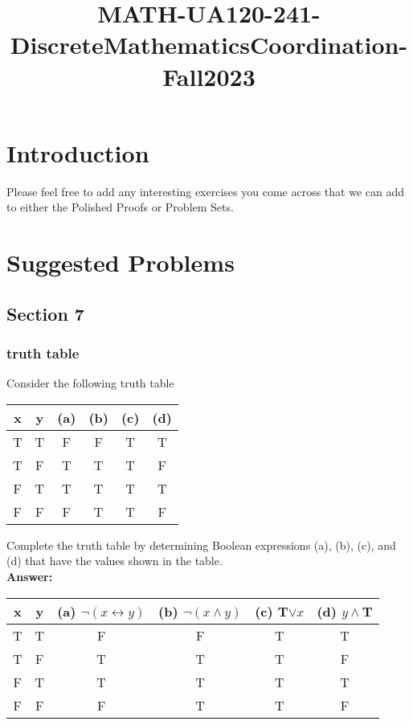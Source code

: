 \documentclass{article}
\title{MATH-UA120-241-DiscreteMathematicsCoordination-Fall2023}
\begin{document}
\maketitle

\section{Introduction}
Please feel free to add any interesting exercises you come across that we can add to either the Polished Proofs or Problem Sets.

\section{Suggested Problems}

\subsection{Section 7}

\subsubsection{truth table}

Consider the following truth table
\begin{table}[h]
\begin{tabular}{@{}cccccc@{}}
\toprule
x & y & (a) \hspace{8mm} & (b) \hspace{8mm}  & (c) \hspace{8mm}  & (d) \hspace{8mm} \\ \midrule
T & T & F   & F   & T   & T   \\
T & F & T   & T   & T   & F   \\
F & T & T   & T   & T   & T   \\
F & F & F   & T   & T   & F   \\ \bottomrule
\end{tabular}
\end{table}

Complete the truth table by determining Boolean expressions (a), (b), (c), and (d) that have the values shown in the table.\\

\textbf{Answer:}
\begin{table}[h]
\begin{tabular}{@{}cccccc@{}}
\toprule
x & y & (a) $\neg (x \leftrightarrow y)$  & (b) $\neg (x \wedge y)$  & (c) T$\vee x$  & (d) $y \wedge$T \\ \midrule
T & T & F   & F   & T   & T   \\
T & F & T   & T   & T   & F   \\
F & T & T   & T   & T   & T   \\
F & F & F   & T   & T   & F   \\ \bottomrule
\end{tabular}
\end{table}
\end{document}
